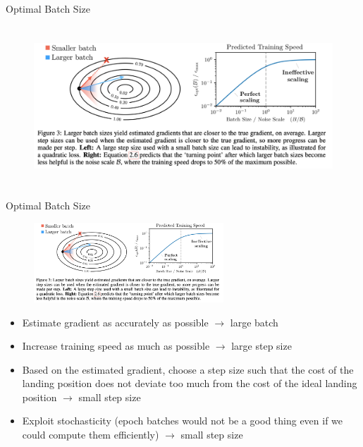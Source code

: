 
\begin{vbframe}{Optimal Batch Size}

\begin{figure}
    \centering
    \includegraphics[height = 6cm]{figure/optimalbatchsize.png}
\end{figure}


\end{vbframe}

\begin{vbframe}{Optimal Batch Size}

\begin{figure}
    \centering
    \includegraphics[height = 3cm]{figure/optimalbatchsize.png}
\end{figure}

\begin{itemize}
    \item Estimate gradient as accurately as possible $\rightarrow$ large batch
    \item Increase training speed as much as possible $\rightarrow$ large step size
    \item Based on the estimated gradient, choose a step size such that the cost of the landing position does not deviate too much from the cost of the ideal landing position $\rightarrow$ small step size
    \item Exploit stochasticity (epoch batches would not be a good thing even if we could compute them efficiently) $\rightarrow$ small step size

\end{itemize}

\end{vbframe}

